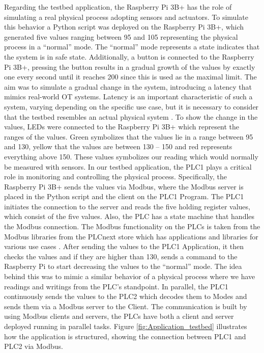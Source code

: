 \documentclass[Master,BMR,english]{twbook}
\begin{document}
Regarding the testbed application, the Raspberry Pi 3B+ has the role of simulating a real physical process adopting sensors and actuators. To simulate this behavior a Python script was deployed on the Raspberry Pi  3B+, which generated five values ranging between 95 and 105 representing the physical process in a “normal” mode. The “normal” mode represents a state indicates that the system is in safe state. Additionally, a button is connected to the Raspberry Pi 3B+, pressing the button results in a gradual growth of the values by exactly one every second until it reaches 200 since this is used as the maximal limit. The aim was to simulate a gradual change in the system, introducing a latency that mimics real-world OT systems. Latency is an important characteristic of such a system, varying depending on the specific use case, but it is necessary to consider that the testbed resembles an actual physical system \cite{korkmaz_ics_2016}. To show the change in the values, LEDs were connected to the Raspberry Pi 3B+ which represent the ranges of the values. Green symbolizes that the values lie in a range between 95 and 130, yellow that the values are between 130 – 150 and red represents everything above 150. These values symbolizes our reading which would normally be measured with sensors. 
In our testbed application, the PLC1 plays a critical role in monitoring and controlling the physical process. Specifically, the Raspberry Pi 3B+ sends the values via Modbus, where the Modbus server is placed in the Python script and the client on the PLC1 Program. The PLC1 initiates the connection to the server and reads the five holding register values, which consist of the five values. Also, the PLC has a state machine that handles the Modbus connection. The Modbus functionality on the PLCs is taken from the Modbus libraries from the PLCnext store which has applications and libraries for various use cases \cite{modbustcp_plcnext_store}. After sending the values to the PLC1 Application, it then checks the values and if they are higher than 130, sends a command to the Raspberry Pi to start decreasing the values to the “normal” mode. The idea behind this was to mimic a similar behavior of a physical process where we have readings and writings from the PLC's standpoint.  
In parallel, the PLC1 continuously sends the values to the PLC2 which decodes them to Modes and sends them via a Modbus server to the Client. The communication is built by using Modbus clients and servers, the PLCs have both a client and server deployed running in parallel tasks. Figure \ref{fig:Application_testbed} illustrates how the application is structured, showing the connection between PLC1 and PLC2 via Modbus.
\end{document}
